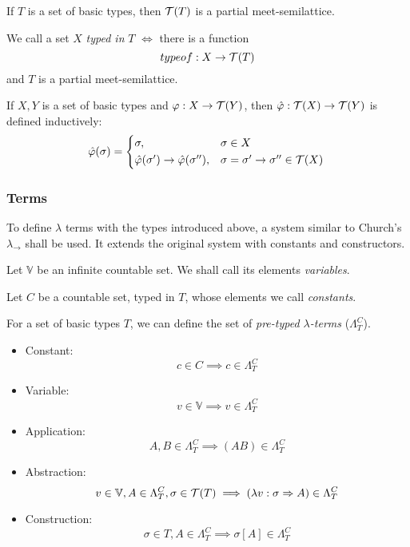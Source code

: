 \documentclass[main.tex]{subfiles}
\begin{document}
\begin{prop}
    If $T$ is a set of basic types, then $\mathcal{T}( T )$ is a partial meet-semilattice.
\end{prop}

\begin{defn}
    We call a set $X$ \emph{typed in} $T$ $\iff$ there is a function
    \[ typeof : X \rightarrow \mathcal{T}( T ) \] and $T$ is a partial meet-semilattice.
\end{defn}

\begin{defn}
    If $X, Y$ is a set of basic types and $\varphi: X \rightarrow \mathcal{T}( Y )$,
    then $\hat{\varphi} : \mathcal{T}( X ) \rightarrow \mathcal{T}( Y )$ is defined inductively:
    \begin{equation*}
        \hat{\varphi}(\sigma) =
        \begin{cases*}
            \sigma, & $\sigma \in X$ \\
            \hat{\varphi}(\sigma') \rightarrow \hat{\varphi}(\sigma''), &
                $\sigma = \sigma' \rightarrow \sigma'' \in \tclos{X}$ \\
        \end{cases*}
    \end{equation*}
\end{defn}

\subsubsection{Terms}
To define $\lambda$ terms with the types introduced above, a system similar
to Church's $\lambda_\rightarrow$ \cite[chap.~2.4]{ttfp} shall be used. It
extends the original system with constants and constructors.

\begin{defn}
    Let $\mathbb{V}$ be an infinite countable set. We shall call its elements
    \emph{variables}.
\end{defn}

\begin{defn}
    Let $C$ be a countable set, typed in $T$,
    whose elements we call \emph{constants}.

    For a set of basic types $T$, we can define the set of
    \emph{pre-typed $\lambda$-terms} ($\Lambda_T^C$).

    \begin{itemize}
        \item Constant:    \[ c \in C \implies c \in \Lambda_T^C \]
        \item Variable:    \[ v \in \mathbb{V} \implies v \in \Lambda_T^C \]
        \item Application: \[ A, B \in \Lambda_T^C \implies (AB) \in \Lambda_T^C \]
        \item Abstraction: \[ v \in \mathbb{V}, A \in \Lambda_T^C, \sigma \in \mathcal{T}( T )
                \implies (\lambda v : \sigma \Rightarrow A) \in \Lambda_T^C \]
        \item Construction: \[ \sigma \in T, A \in \Lambda_T^C
                \implies \sigma[A] \in \Lambda_T^C \]
    \end{itemize}
\end{defn}
\end{document}
